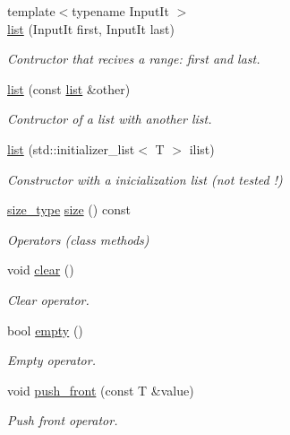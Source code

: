 \begin{DoxyCompactItemize}
{\footnotesize template$<$typename Input\+It $>$ }\\\hyperlink{classsc_1_1list_a142545a98bc5fec38606bf7000620864}{list} (Input\+It first, Input\+It last)
\begin{DoxyCompactList}\small\item\em Contructor that recives a range\+: first and last. \end{DoxyCompactList}\item 
\hyperlink{classsc_1_1list_a1fe5b60798e979cb0a5b1663d64ec69b}{list} (const \hyperlink{classsc_1_1list}{list} \&other)
\begin{DoxyCompactList}\small\item\em Contructor of a list with another list. \end{DoxyCompactList}\item 
\hyperlink{classsc_1_1list_ae85152bcf538c929944790b1c30d3b22}{list} (std\+::initializer\+\_\+list$<$ T $>$ ilist)
\begin{DoxyCompactList}\small\item\em Constructor with a inicialization list (not tested !) \end{DoxyCompactList}\item 
\hyperlink{classsc_1_1list_acbac64cff34d45bb9c61771493db48ec}{size\+\_\+type} \hyperlink{classsc_1_1list_a0fe585f3f9e33058294c3a590c7bfdea}{size} () const
\begin{DoxyCompactList}\small\item\em Operators (class methods) \end{DoxyCompactList}\item 
void \hyperlink{classsc_1_1list_aece86319a40d15b88fd1a981ba1a226e}{clear} ()
\begin{DoxyCompactList}\small\item\em Clear operator. \end{DoxyCompactList}\item 
bool \hyperlink{classsc_1_1list_a8599ccd8f27e0f39a1c3051cd9d05bdb}{empty} ()
\begin{DoxyCompactList}\small\item\em Empty operator. \end{DoxyCompactList}\item 
void \hyperlink{classsc_1_1list_a24a7b8a81765dfe0351ddb263bc6d754}{push\+\_\+front} (const T \&value)
\begin{DoxyCompactList}\small\item\em Push front operator. \end{DoxyCompactList}\item 

\end{DoxyCompactItemize}
